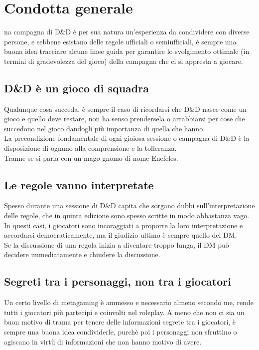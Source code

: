 
\section{Condotta generale}

na campagna di D\&D è per sua natura un'esperienza da condividere con diverse persone, e sebbene esistano delle regole ufficiali o semiufficiali, è sempre una buona idea tracciare alcune linee guida per garantire lo svolgimento ottimale (in termini di gradevolezza del gioco) della campagna che ci si appresta a giocare.

\subsection{D\&D è un gioco di squadra}

Qualunque cosa succeda, è sempre il caso di ricordarsi che D\&D nasce come un gioco e quello deve restare, non ha senso prendersela o arrabbiarsi per cose che succedono nel gioco dandogli più importanza di quella che hanno. \\ La precondizione fondamentale di ogni gioiosa sessione o campagna di D\&D è la disposizione di ognuno alla comprensione e la tolleranza. \\ Tranne se si parla con un mago gnomo di nome Enefeles.

\subsection{Le regole vanno interpretate}

Spesso durante una sessione di D\&D capita che sorgano dubbi sull'interpretazione delle regole, che in quinta edizione sono spesso scritte in modo abbastanza vago. \\ In questi casi, i giocatori sono incoraggiati a proporre la loro interpretazione e accordarsi democraticamente, ma il giudizio ultimo è sempre quello del DM. \\ Se la discussione di una regola inizia a diventare troppo lunga, il DM può decidere immediatamente e chiudere la discussione.

\subsection{Segreti tra i personaggi, non tra i giocatori}

Un certo livello di metagaming è ammesso e necessario almeno secondo me, rende tutti i giocatori più partecipi e coinvolti nel roleplay. A meno che non ci sia un buon motivo di trama per tenere delle informazioni segrete tra i giocatori, è sempre una buona idea condividerle, purchè poi i personaggi non sfruttino o agiscano in virtù di informazioni che non hanno motivo di avere.

